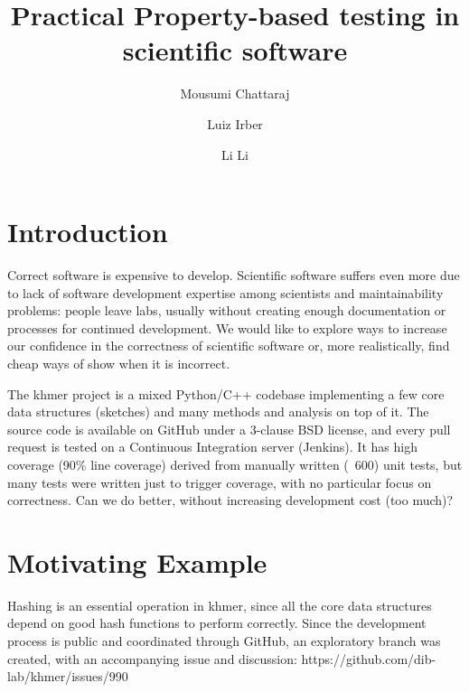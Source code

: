 \documentclass[preprint,nocopyrightspace]{sig-alternate}
\begin{document}
%

\title{Practical Property-based testing in scientific software}

\author{Mousumi Chattaraj}
\author{Luiz Irber}
\author{Li Li}


\maketitle


\section{Introduction}
Correct software is expensive to develop.
Scientific software suffers even more due to lack of software development expertise among scientists and maintainability problems:
people leave labs,
usually without creating enough documentation or processes for continued development.
We would like to explore ways to increase our confidence in the correctness of scientific software or,
more realistically,
find cheap ways of show when it is incorrect.

The khmer project is a mixed Python/C++ codebase implementing a few core data structures (sketches) and many methods and analysis on top of it.
The source code is available on GitHub under a 3-clause BSD license,
and every pull request is tested on a Continuous Integration server (Jenkins).
It has high coverage (90\% line coverage) derived from manually written (~600) unit tests,
but many tests were written just to trigger coverage,
with no particular focus on correctness.
Can we do better, without increasing development cost (too much)?

\section{Motivating Example}

Hashing is an essential operation in khmer,
since all the core data structures depend on good hash functions to perform correctly.
Since the development process is public and coordinated through GitHub,
an exploratory branch was created,
with an accompanying issue and discussion: https://github.com/dib-lab/khmer/issues/990
\end{document}
